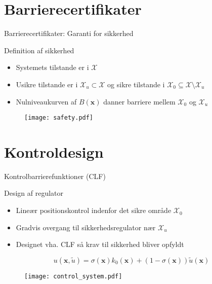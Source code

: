 \section{Barrierecertifikater}
\begin{frame}{Barrierecertifikater: Garanti for sikkerhed}
\vspace{2mm}
\begin{block}{Definition af sikkerhed}
	\begin{itemize}
		\item Systemets tilstande er i $\mathcal{X}$
		\item Usikre tilstande er i $\mathcal{X}_u\subset\mathcal{X}$ og sikre tilstande i $\mathcal{X}_0\subseteq\mathcal{X}\setminus\mathcal{X}_u$
		\item Nulniveaukurven af $B(\textbf{x})$ danner  barriere mellem $\mathcal{X}_0$ og $\mathcal{X}_u$
	\end{itemize}
\end{block}
\begin{figure}[h]
	\centering
	\texttt{[image: safety.pdf]}
\end{figure}
\vspace{1cm}
\end{frame}

\section{Kontroldesign}
\begin{frame}{Kontrolbarrierefunktioner (CLF)}
	\vspace{2mm}
\begin{block}{Design af regulator}
	\begin{itemize}
		\item Lineær positionskontrol indenfor det sikre område $\mathcal{X}_0$
		\item Gradvis overgang til sikkerhedsregulator nær $\mathcal{X}_u$
		\item Designet vha. CLF så krav til sikkerhed bliver opfyldt
	\end{itemize}
\end{block}
\vspace{-2mm}
\begin{equation*}
u(\mathbf{x},\tilde{u})=\sigma(\mathbf{x})k_0(\mathbf{x})+(1-\sigma(\mathbf{x}))\tilde{u}(\mathbf{x})
\end{equation*}

\begin{figure}[h]
	\centering
	\texttt{[image: control\_system.pdf]}
\end{figure}
	\vspace{5mm}
\end{frame}